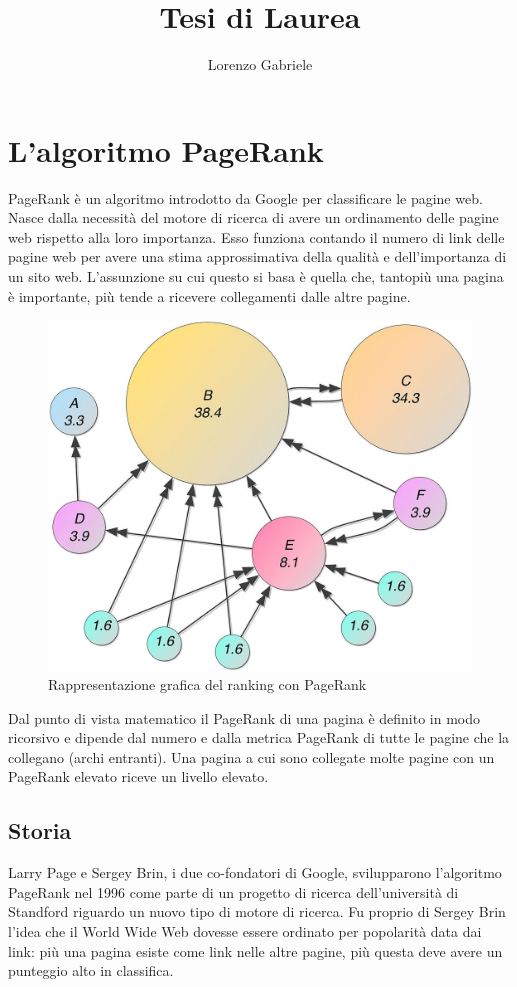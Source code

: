 \documentclass[a4paper,12pt]{article}
\title{Tesi di Laurea}
\author{Lorenzo Gabriele}
\let\oldsection\section
\renewcommand\section{\clearpage\oldsection}
\begin{document}
\maketitle
\clearpage
\tableofcontents
\clearpage

\section{L'algoritmo PageRank}
PageRank è un algoritmo introdotto da Google per classificare le pagine web. 
Nasce dalla necessità del motore di ricerca di avere un ordinamento delle pagine web rispetto alla loro importanza. Esso funziona contando il numero di link delle pagine web per avere una stima approssimativa della qualità e dell'importanza di un sito web. L'assunzione su cui questo si basa è quella che, tantopiù una pagina è importante, più tende a ricevere collegamenti dalle altre pagine.
\begin{figure}[h!]
  \includegraphics[width=\linewidth]{images/pagerank.jpg}
  \caption{Rappresentazione grafica del ranking con PageRank}
\end{figure}
Dal punto di vista matematico il PageRank di una pagina è definito in modo ricorsivo e dipende dal numero e dalla metrica PageRank di tutte le pagine che la collegano (archi entranti). Una pagina a cui sono collegate molte pagine con un PageRank elevato riceve un livello elevato.
\subsection{Storia}
Larry Page e Sergey Brin, i due co-fondatori di Google, svilupparono l'algoritmo PageRank nel 1996 come parte di un progetto di ricerca dell'università di Standford riguardo un nuovo tipo di motore di ricerca. Fu proprio di Sergey Brin l'idea che il World Wide Web dovesse essere ordinato per popolarità data dai link: più una pagina esiste come link nelle altre pagine, più questa deve avere un punteggio alto in classifica.
\end{document}
